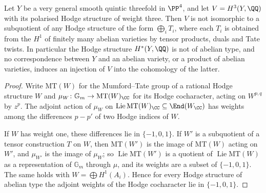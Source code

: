 \begin{proposition}
\label{prop:noabeliantype}
Let $Y$ be a very general smooth quintic threefold in $\PP^{4}$, and let
$V=H^{3}(Y,\QQ)$ with its polarised Hodge structure of weight three. Then $V$
is not isomorphic to a subquotient of any Hodge structure of the form
$\bigoplus_{i}T_{i}$, where each $T_{i}$ is obtained from the $H^{1}$ of
finitely many abelian varieties by tensor products, duals and Tate twists. In
particular the Hodge structure $H^{*}(Y,\QQ)$ is not of abelian type, and no
correspondence between $Y$ and an abelian variety, or a product of abelian
varieties, induces an injection of $V$ into the cohomology of the latter.
\end{proposition}

\begin{proof}
Write $\mathrm{MT}(W)$ for the Mumford--Tate group of a rational Hodge
structure $W$ and $\mu_{W}\colon\mathbb{G}_{m}\to\mathrm{MT}(W)_{\CC}$ for
its Hodge cocharacter, acting on $W^{p,q}$ by $z^{p}$. The adjoint action of
$\mu_{W}$ on $\operatorname{Lie}\mathrm{MT}(W)_{\CC}\subseteq\End(W_{\CC})$ has weights
among the differences $p-p'$ of two Hodge indices of $W$.

If $W$ has weight one, these differences lie in $\{-1,0,1\}$. If $W'$ is a
subquotient of a tensor construction $T$ on $W$, then $\mathrm{MT}(W')$ is the
image of $\mathrm{MT}(W)$ acting on $W'$, and $\mu_{W'}$ is the image of
$\mu_{W}$; so $\operatorname{Lie}\mathrm{MT}(W')$ is a quotient of $\operatorname{Lie}\mathrm{MT}(W)$
as a representation of $\mathbb{G}_{m}$ through $\mu$, and its weights are a
subset of $\{-1,0,1\}$. The same holds with $W=\bigoplus H^{1}(A_{i})$.
Hence for every Hodge structure of abelian type the adjoint weights of the
Hodge cocharacter lie in $\{-1,0,1\}$.


\end{proof}
